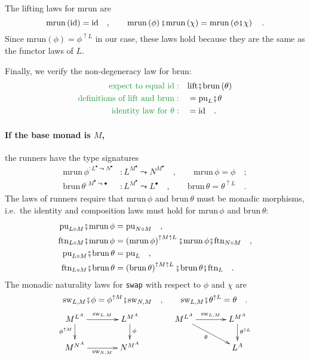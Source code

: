 The lifting laws for $\text{mrun}$ are
\[
\text{mrun}\left(\text{id}\right)=\text{id}\quad,\quad\quad\text{mrun}\left(\phi\right)\bef\text{mrun}\left(\chi\right)=\text{mrun}\left(\phi\bef\chi\right)\quad.
\]
Since $\text{mrun}\left(\phi\right)=\phi^{\uparrow L}$ in our case,
these laws hold because they are the same as the functor laws of $L$.

Finally, we verify the non-degeneracy law for $\text{brun}$:
\begin{align*}
{\color{greenunder}\text{expect to equal }\text{id}:}\quad & \text{lift}\bef\text{brun}\left(\theta\right)\\
{\color{greenunder}\text{definitions of }\text{lift}\text{ and }\text{brun}:}\quad & =\text{pu}_{L}\bef\theta\\
{\color{greenunder}\text{identity law for }\theta:}\quad & =\text{id}\quad.
\end{align*}


\paragraph{If the base monad is $M$, }

the runners have the type signatures
\begin{align*}
\text{mrun}\,\phi^{:L^{\bullet}\leadsto N^{\bullet}} & :L^{M^{\bullet}}\leadsto N^{M^{\bullet}}\quad,\quad\quad\text{mrun}\,\phi=\phi\quad;\\
\text{brun}\,\theta^{:M^{\bullet}\leadsto\bullet} & :L^{M^{\bullet}}\leadsto L^{\bullet}\quad,\quad\quad\text{brun}\,\theta=\theta^{\uparrow L}\quad.
\end{align*}
The laws of runners require that $\text{mrun}\,\phi$ and $\text{brun}\,\theta$
must be monadic morphisms, i.e.~the identity and composition laws
must hold for $\text{mrun}\,\phi$ and $\text{brun}\,\theta$:
\begin{align*}
\text{pu}_{L\circ M}\bef\text{mrun}\,\phi & =\text{pu}_{N\circ M}\quad,\\
\text{ftn}_{L\circ M}\bef\text{mrun}\,\phi & =\left(\text{mrun}\,\phi\right)^{\uparrow M\uparrow L}\bef\text{mrun}\,\phi\bef\text{ftn}_{N\circ M}\quad,\\
\text{pu}_{L\circ M}\bef\text{brun}\,\theta & =\text{pu}_{L}\quad,\\
\text{ftn}_{L\circ M}\bef\text{brun}\,\theta & =\left(\text{brun}\,\theta\right)^{\uparrow M\uparrow L}\bef\text{brun}\,\theta\bef\text{ftn}_{L}\quad.
\end{align*}
The monadic naturality laws for \lstinline!swap!
with respect to $\phi$ and $\chi$ are 
\[
\text{sw}_{L,M}\bef\phi=\phi^{\uparrow M}\bef\text{sw}_{N,M}\quad,\quad\quad\text{sw}_{L,M}\bef\theta^{\uparrow L}=\theta\quad.
\]
\[
\xymatrix{\xyScaleY{1.5pc}\xyScaleX{3pc}M^{L^{A}}\ar[r]\sp(0.5){\text{sw}_{L,M}}\ar[d]\sb(0.4){\phi^{\uparrow M}} & L^{M^{A}}\ar[d]\sp(0.4){\phi} & M^{L^{A}}\ar[r]\sp(0.5){\text{sw}_{L,M}}\ar[rd]\sb(0.45){\theta} & L^{M^{A}}\ar[d]\sp(0.4){\theta^{\uparrow L}}\\
M^{N^{A}}\ar[r]\sb(0.5){\text{sw}_{N,M}} & N^{M^{A}} &  & L^{A}
}
\]

